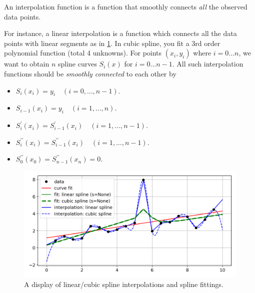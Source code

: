\begin{defn}[Interpolation]
An interpolation function is a function that smoothly connects \textit{all} the observed data points.
\end{defn}

For instance, a linear interpolation is a function which connects all the data points with linear segments as in \cref{fig:interpolation}. In cubic spline, you fit a 3rd order polynomial function (total 4 unknowns). For points $ (x_i, y_i) $ where $ i = 0 \ldots n $, we want to obtain $ n $ spline curves $ S_i(x) $ for $ i = 0 \ldots n-1 $. All such interpolation functions should be \textit{smoothly connected} to each other by
\begin{itemize}
  \item $ S_i (x_i ) = y_i      \quad(i = 0 , \ldots , n-1). $
  \item $ S_{i-1} (x_i ) = y_i  \quad(i = 1 , \ldots , n). $
  \item $ S^\prime_i (x_i) = S^\prime_{i-1} (x_i)\quad(i = 1 , \ldots , n-1). $
  \item $ S^{\prime\prime}_i (x_i) = S^{\prime\prime}_{i-1} (x_i) \quad(i = 1 , \ldots , n-1). $
  \item $ S^{\prime\prime}_0 (x_0) = S^{\prime\prime}_{n-1} (x_n) =0 $.
\end{itemize}

\begin{figure}
  \centering
  \includegraphics[width=0.7\linewidth]{figs/interpolation}
  \caption{A display of linear/cubic spline interpolations and spline fittings.}
  \label{fig:interpolation}
\end{figure}

